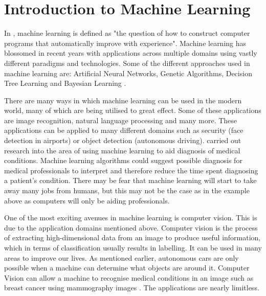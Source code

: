 \section{Introduction to Machine Learning}
In \parencite{MLANN}, machine learning is defined as "the question of how to
construct computer programs that automatically improve with experience".
Machine learning has blossomed in recent years with applications across multiple
domains using vastly different paradigms and technologies. 
Some of the different approaches used in machine learning are: Artificial Neural Networks, Genetic Algorithms, Decision Tree Learning and Bayesian Learning \parencite{MLANN}.

There are many ways in which machine learning can be used in the modern world,
many of which are being utilised to great effect.
Some of these applications are image recognition, natural language
processing and many more.
These applications can be applied to many different domains such as security (face detection in airports) or object detection (autonomous driving).
\parencite{medical} carried out research into the area of using machine learning to aid diagnosis of medical conditions.
Machine learning algorithms could suggest possible diagnosis for medical professionals to interpret and therefore reduce the time spent diagnosing a patient's condition.
There may be fear that machine learning will start to take away many jobs
from
humans, but this may not be the case as in the example above as computers will only be aiding professionals.

One of the most exciting avenues in machine learning is computer
vision.
This is due to the application domains mentioned above. 
Computer vision is the process of extracting high-dimensional data from an image to produce useful information, which in terms of classification usually results in labelling. It can be used in many areas to improve our lives. As
mentioned earlier, autonomous cars are only possible when a machine can
determine what objects are around it. Computer Vision can allow a machine to
recognise medical conditions in an image such as breast cancer using mammography images \parencite{medical}. The applications are nearly limitless.